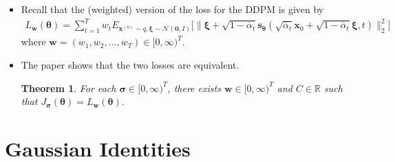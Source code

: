 \documentclass[10pt]{article}
\newtheorem{theorem}[lemma]{Theorem}
\newcommand{\ve}[1]{\mathbf{#1}}
\newcommand{\ves}[1]{\boldsymbol{#1}}
\newcommand{\mcal}[1]{\mathcal{#1}}
\newcommand{\Real}{\mathbb{R}}
\begin{document}
\begin{itemize}
  \item Recall that the (weighted) version of the loss for the DDPM is given by
  \begin{align*}
    L_{\ve{w}}(\ves{\theta})
    = \sum_{t=1}^T w_t E_{\ve{x}^{(0)} \sim q, \ves{\xi} \sim \mcal{N}(\ve{0},I)} \Big[ 
      \big\| \ves{\xi} + \sqrt{1-\overline{\alpha}_t} \ve{s}_{\ves{\theta}}(\sqrt{\overline{\alpha}_t} \ve{x}_0 + \sqrt{1 - \overline{\alpha}_t} \ves{\xi} , t) \big\|^2_2
    \Big]
  \end{align*}
  where $\ve{w} = (w_1, w_2, \dotsc, w_T) \in [0,\infty)^T$.

  \item The paper shows that the two losses are equivalent.
  \begin{theorem}
    For each $\ves{\sigma} \in [0,\infty)^T$, there exists $\ve{w} \in [0,\infty)^T$ and $C \in \Real$ such that $J_{\ves{\sigma}}(\ves{\theta}) = L_{\ve{w}}(\ves{\theta}).$
  \end{theorem}  
\end{itemize}

\appendix

\section{Gaussian Identities}
\end{document}
